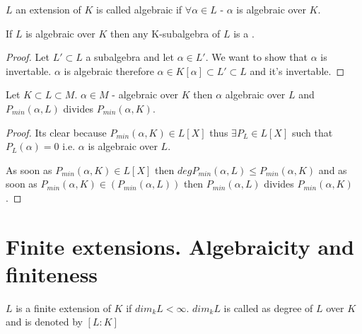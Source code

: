 \begin{definition}
  $L$ an extension of $K$ is called algebraic if $\forall \alpha \in
  L$ - $\alpha$ is algebraic over $K$.
  \label{def:algebraicextension}
\end{definition}

\begin{proposition}
  If $L$ is algebraic over $K$ then any K-subalgebra of $L$ is a
  .
  \begin{proof}
    Let $L' \subset L$ a subalgebra and let $\alpha \in L'$. We want
    to show that $\alpha$ is invertable. $\alpha$ is algebraic
    therefore $\alpha \in K\left[\alpha\right] \subset L' \subset L$
    and it's invertable.
  \end{proof}
\end{proposition}

\begin{proposition}
  Let $K \subset L \subset M$. $\alpha \in M$ - algebraic over $K$
  then $\alpha$ algebraic over $L$ and
  $P_{min}\left(\alpha, L\right)$ divides $P_{min}\left(\alpha,
  K\right)$. 
  \begin{proof}
    Its clear because $P_{min}\left(\alpha,K\right) \in
    L\left[X\right]$ thus $\exists P_L \in L\left[X\right]$ such that
    $P_L\left(\alpha\right) = 0$ i.e. $\alpha$ is algebraic over $L$.

    As soon as $P_{min}\left(\alpha,K\right) \in L\left[X\right]$ then
    $deg P_{min}\left(\alpha,L\right) \le
    P_{min}\left(\alpha,K\right)$ and as soon as
    \(
    P_{min}\left(\alpha,K\right) \in \left(P_{min}\left(\alpha,L\right)\right)
    \)
    then $P_{min}\left(\alpha,L\right)$ divides
    $P_{min}\left(\alpha,K\right)$. 
  \end{proof}
\end{proposition}


\section{Finite extensions. Algebraicity and finiteness}

\begin{definition}
  $L$ is a finite extension of $K$ if $dim_k L < \infty$. $dim_k L$ is
  called as degree of $L$ over $K$ and is denoted by
  $\left[L:K\right]$
  \label{def:finiteextension}
\end{definition}

